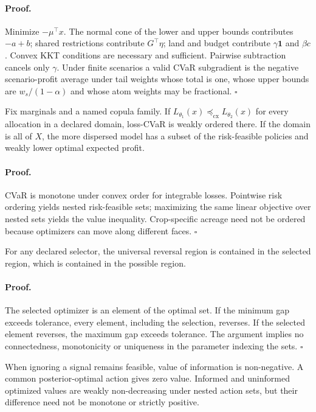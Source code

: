 \paragraph{Proof.} Minimize $-\mu^\top x$. The normal cone of the lower and upper bounds contributes $-a+b$; shared restrictions contribute $G^\top\eta$; land and budget contribute $\gamma\mathbf 1$ and $\beta c$. Convex KKT conditions are necessary and sufficient. Pairwise subtraction cancels only $\gamma$. Under finite scenarios a valid CVaR subgradient is the negative scenario-profit average under tail weights whose total is one, whose upper bounds are $w_s/(1-\alpha)$ and whose atom weights may be fractional. \hfill$\square$

\begin{theorem}
Fix marginals and a named copula family. If $L_{\theta_1}(x)\preceq_{\mathrm{cx}}L_{\theta_2}(x)$ for every allocation in a declared domain, loss-CVaR is weakly ordered there. If the domain is all of $X$, the more dispersed model has a subset of the risk-feasible policies and weakly lower optimal expected profit.
\end{theorem}
\paragraph{Proof.} CVaR is monotone under convex order for integrable losses. Pointwise risk ordering yields nested risk-feasible sets; maximizing the same linear objective over nested sets yields the value inequality. Crop-specific acreage need not be ordered because optimizers can move along different faces. \hfill$\square$

\begin{proposition}
For any declared selector, the universal reversal region is contained in the selected region, which is contained in the possible region.
\end{proposition}
\paragraph{Proof.} The selected optimizer is an element of the optimal set. If the minimum gap exceeds tolerance, every element, including the selection, reverses. If the selected element reverses, the maximum gap exceeds tolerance. The argument implies no connectedness, monotonicity or uniqueness in the parameter indexing the sets. \hfill$\square$

\begin{theorem}
When ignoring a signal remains feasible, value of information is non-negative. A common posterior-optimal action gives zero value. Informed and uninformed optimized values are weakly non-decreasing under nested action sets, but their difference need not be monotone or strictly positive.
\end{theorem}
